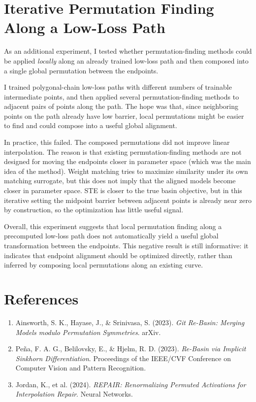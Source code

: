 \documentclass[11pt,a4paper]{article}
\begin{document}
\section{Iterative Permutation Finding Along a Low-Loss Path}

As an additional experiment, I tested whether permutation-finding methods could be applied \emph{locally} along an already trained low-loss path and then composed into a single global permutation between the endpoints.

I trained polygonal-chain low-loss paths with different numbers of trainable intermediate points, and then applied several permutation-finding methods to adjacent pairs of points along the path. The hope was that, since neighboring points on the path already have low barrier, local permutations might be easier to find and could compose into a useful global alignment.

In practice, this failed. The composed permutations did not improve linear interpolation. The reason is that existing permutation-finding methods are not designed for moving the endpoints closer in parameter space (which was the main idea of the method). Weight matching tries to maximize similarity under its own matching surrogate, but this does not imply that the aligned models become closer in parameter space. STE is closer to the true basin objective, but in this iterative setting the midpoint barrier between adjacent points is already near zero by construction, so the optimization has little useful signal.

Overall, this experiment suggests that local permutation finding along a precomputed low-loss path does not automatically yield a useful global transformation between the endpoints. This negative result is still informative: it indicates that endpoint alignment should be optimized directly, rather than inferred by composing local permutations along an existing curve.

\section{References}

\begin{enumerate}
    \item Ainsworth, S. K., Hayase, J., \& Srinivasa, S. (2023). \textit{Git Re-Basin: Merging Models modulo Permutation Symmetries}. arXiv.
    \item Pe\~na, F. A. G., Belilovsky, E., \& Hjelm, R. D. (2023). \textit{Re-Basin via Implicit Sinkhorn Differentiation}. Proceedings of the IEEE/CVF Conference on Computer Vision and Pattern Recognition.
    \item Jordan, K., et al. (2024). \textit{REPAIR: Renormalizing Permuted Activations for Interpolation Repair}. Neural Networks.
\end{enumerate}
\end{document}
